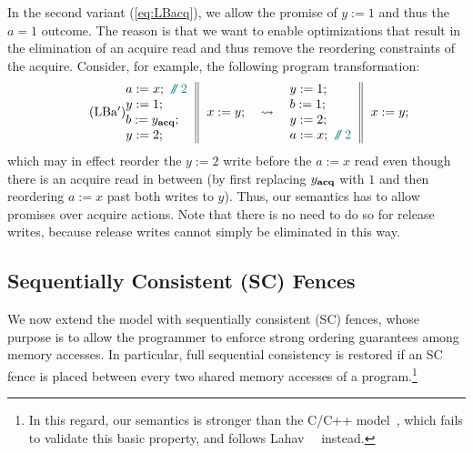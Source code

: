 In the second variant (\ref{eq:LBacq}), we allow the promise of $y:=1$ and thus the $a=1$ outcome.
The reason is that we want to enable optimizations that 
result in the elimination of an acquire read and thus remove the reordering constraints of the acquire.
Consider, for example, the following program transformation:
\begin{equation}\label{eq:acq_merge}\tag{LBa$'$}
\inarrII{a:=x;\comment{2}\\ y:=1;\\b := y_{\acqr};\\y:=2;}{x:=y;} \quad \leadsto \quad
\inarrII{y:=1;\\b := 1;\\y:=2;\\ a:=x;\comment{2}}{x:=y;}
\end{equation}
which may in effect reorder the $y:=2$ write before the $a:=x$ read even though there is an acquire read in between
(by first replacing $y_{\textbf{acq}}$ with $1$ and then reordering $a:=x$ past both writes to $y$).
Thus, our semantics has to allow promises over acquire actions.
Note that there is no need to do so for release writes, because release writes cannot simply be eliminated in this way.



\subsection{Sequentially Consistent (SC) Fences}
\label{sec:sc}

We now extend the model with sequentially consistent (SC) fences, 
whose purpose is to allow the programmer
to enforce strong ordering guarantees among memory accesses. 
In particular, full
sequential consistency is restored if an SC fence is  
placed between every two shared memory accesses of
a program.\footnote{In this regard, our semantics is stronger than the C/C++ model~\cite{Batty:2011},
which fails to validate this basic property, and follows Lahav~\etal~\cite{sra,rc11} instead.} 

